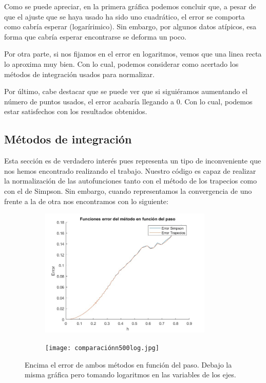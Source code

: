 \documentclass[12pt]{article}
\begin{document}
Como se puede apreciar, en la primera gráfica podemos concluir
que, a pesar de que el ajuste que se haya usado ha sido uno 
cuadrático, el error se comporta como cabría esperar (logarírimico).
Sin embargo, por algunos datos atípicos, esa forma que cabría esperar
encontrarse se deforma un poco. \\
\par 
Por otra parte, si nos fijamos en el error en logaritmos, 
vemos que una linea recta lo aproxima muy bien. Con lo cual, 
podemos considerar como acertado los métodos de integración usados
para normalizar. \\
\par 
Por último, cabe destacar que se puede ver que si siguiéramos 
aumentando el número de puntos usados, el error acabaría llegando 
a 0. Con lo cual, podemos estar satisfechos con los resultados 
obtenidos.
\subsection{Métodos de integración}

    Esta sección es de verdadero interés pues representa un tipo de inconveniente que nos hemos encontrado realizando el trabajo. Nuestro código es capaz de realizar la normalización de las autofunciones tanto con el método de los trapecios como con el de Simpson. Sin embargo, cuando representamos la convergencia de uno frente a la de otra nos encontramos con lo siguiente:

        \begin{figure}[H]
    \centering
    \begin{subfigure}{1\textwidth}
            \includegraphics[width=0.9\textwidth]{comparacionn500.jpg}
    \end{subfigure}
    \hfill
    \begin{subfigure}{1\textwidth}
            \texttt{[image: comparaciónn500log.jpg]}
    \end{subfigure}
    \caption{Encima el error de ambos métodos en función del paso. Debajo la misma gráfica pero tomando logaritmos en las variables de los ejes.}
    \end{figure}
\end{document}
